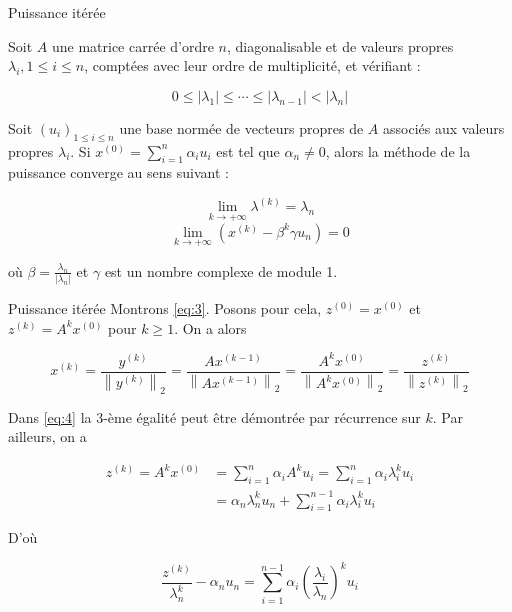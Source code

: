 \documentclass[french, 10pt]{beamer}
\theoremstyle{definition}
\begin{document}
\begin{frame}{Puissance itérée}
	\begin{theorem}
			Soit $A$ une matrice carrée d'ordre $n$, diagonalisable et de valeurs propres $\lambda_i, 1 \leq i \leq n$, comptées avec leur ordre de multiplicité, et vérifiant :
		
		$$
		0 \leq\left|\lambda_1\right| \leq \cdots \leq\left|\lambda_{n-1}\right|<\left|\lambda_n\right|
		$$
		
		
		Soit $\left(u_i\right)_{1 \leq i \leq n}$ une base normée de vecteurs propres de $A$ associés aux valeurs propres $\lambda_i$. Si $x^{(0)}=\sum_{i=1}^n \alpha_i u_i$ est tel que $\alpha_n \neq 0$, alors la méthode de la puissance converge au sens suivant :
	
        \begin{equation}
        			\lim _{k \rightarrow+\infty} \lambda^{(k)}=\lambda_n 
		    \label{eq:2}
		\end{equation}
        		\begin{equation}
			\lim _{k \rightarrow+\infty}\left(x^{(k)}-\beta^k \gamma u_n\right)=0
		    \label{eq:3}
		\end{equation}

		où $\beta=\frac{\lambda_n}{\left|\lambda_n\right|}$ et $\gamma$ est un nombre complexe de module 1.
		
	\end{theorem}

\end{frame}
\begin{frame}{Puissance itérée}
			Montrons \eqref{eq:3}. Posons pour cela, $z^{(0)}=x^{(0)}$ et $z^{(k)}=A^k x^{(0)}$ pour $k \geq 1$. On a alors
		
		\begin{equation}
		   		x^{(k)}=\frac{y^{(k)}}{\left\|y^{(k)}\right\|_2}=\frac{A x^{(k-1)}}{\left\|A x^{(k-1)}\right\|_2}=\frac{A^k x^{(0)}}{\left\|A^k x^{(0)}\right\|_2}=\frac{z^{(k)}}{\left\|z^{(k)}\right\|_2}
                \label{eq:4}
		\end{equation}

		
		
		
		Dans \eqref{eq:4} la 3-ème égalité peut être démontrée par récurrence sur $k$.
		Par ailleurs, on a
		
		\begin{equation}
		    		\begin{aligned}
			z^{(k)}=A^k x^{(0)} & =\sum_{i=1}^n \alpha_i A^k u_i=\sum_{i=1}^n \alpha_i \lambda_i^k u_i \\
			& =\alpha_n \lambda_n^k u_n+\sum_{i=1}^{n-1} \alpha_i \lambda_i^k u_i
		\end{aligned}
        \label{eq:5}
		\end{equation}

	
		
		
		D'où
		
\begin{equation}
    		\frac{z^{(k)}}{\lambda_n^k}-\alpha_n u_n=\sum_{i=1}^{n-1} \alpha_i\left(\frac{\lambda_i}{\lambda_n}\right)^k u_i
            \label{eq:6}
\end{equation}
		
		
	
\end{frame}
\end{document}
